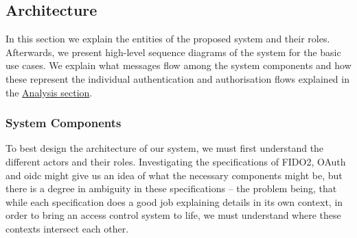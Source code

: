 \subsection{Architecture}
In this section we explain the entities of the proposed system and their roles. Afterwards, we present high-level sequence diagrams of the system for the basic use cases. We explain what messages flow among the system components and how these represent the individual authentication and authorisation flows explained in the \href{sec:analysis}{Analysis section}.

\subsubsection{System Components}
To best design the architecture of our system, we must first understand the different actors and their roles. Investigating the specifications of FIDO2, OAuth and \acrshort{oidc} might give us an idea of what the necessary components might be, but there is a degree in ambiguity in these specifications -- the problem being, that while each specification does a good job explaining details in its own context, in order to bring an access control system to life, we must understand where these contexts intersect each other.

